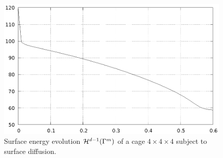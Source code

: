 \begin{figure}[htbp]
\centering
\includegraphics[width=.45\textwidth]
{figures/geometric_pdes/sd_cage_energy.ps}
\caption[Surface diffusion cage surface energy]{Surface energy evolution
$\mathcal{H}^{d-1}(\Gamma^m)$ of a cage $4 \times 4 \times 4$ subject to surface
diffusion.}
\label{fig:sd_cage_energy}
\end{figure}
